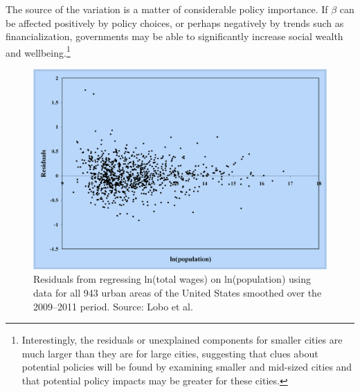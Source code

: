 



The source of the variation is a matter of considerable policy importance. If $\beta$ can be affected positively by policy choices, or perhaps negatively by trends such as financialization, governments may be able to significantly increase social wealth and wellbeing.\footnote{Interestingly, the residuals or unexplained components for smaller cities are much larger than they are for large cities, suggesting that clues about potential policies will be found by examining smaller and mid-sized cities and that potential policy impacts may be greater for these cities.}

\begin{figure}
    \centering
    \includegraphics[scale=0.25]{fig/Residuals-Lobo.png}
    \caption{Residuals from regressing ln(total wages) on ln(population) using data for all 943 urban areas of the United States smoothed over the 2009–2011 period. Source: Lobo et al.\cite{loboUrbanScalingProduction2013}}
    \label{fig:Residuals-Lobo}
\end{figure}


